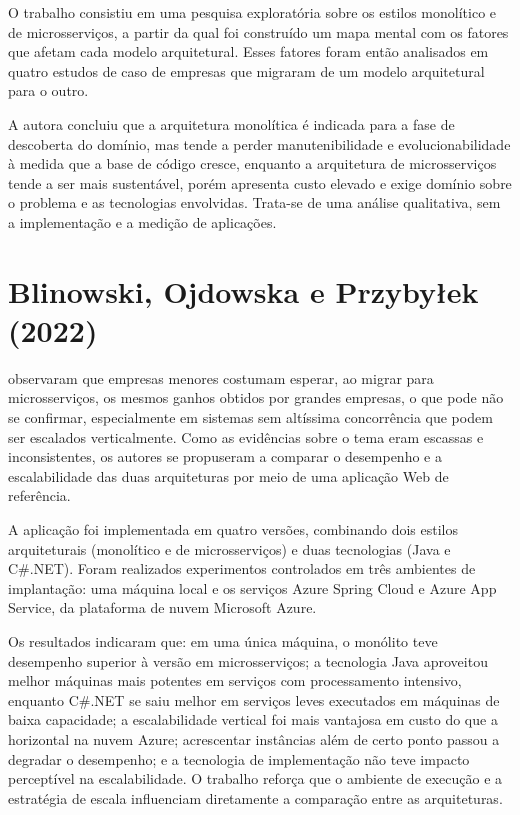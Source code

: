 O trabalho consistiu em uma pesquisa exploratória sobre os estilos monolítico e de
microsserviços, a partir da qual foi construído um mapa mental com os fatores que afetam cada
modelo arquitetural. Esses fatores foram então analisados em quatro estudos de caso de
empresas que migraram de um modelo arquitetural para o outro.

A autora concluiu que a arquitetura monolítica é indicada para a fase de descoberta do domínio,
mas tende a perder manutenibilidade e evolucionabilidade à medida que a base de código cresce,
enquanto a arquitetura de microsserviços tende a ser mais sustentável, porém apresenta custo
elevado e exige domínio sobre o problema e as tecnologias envolvidas. Trata-se de uma análise
qualitativa, sem a implementação e a medição de aplicações.

\section{Blinowski, Ojdowska e Przybyłek (2022)}

 observaram que empresas menores costumam esperar, ao migrar para
microsserviços, os mesmos ganhos obtidos por grandes empresas, o que pode não se confirmar,
especialmente em sistemas sem altíssima concorrência que podem ser escalados verticalmente.
Como as evidências sobre o tema eram escassas e inconsistentes, os autores se propuseram a
comparar o desempenho e a escalabilidade das duas arquiteturas por meio de uma aplicação Web de
referência.

A aplicação foi implementada em quatro versões, combinando dois estilos arquiteturais
(monolítico e de microsserviços) e duas tecnologias (Java e C\#.NET). Foram realizados
experimentos controlados em três ambientes de implantação: uma máquina local e os serviços
Azure Spring Cloud e Azure App Service, da plataforma de nuvem Microsoft Azure.

Os resultados indicaram que: em uma única máquina, o monólito teve desempenho superior à
versão em microsserviços; a tecnologia Java aproveitou melhor máquinas mais potentes em
serviços com processamento intensivo, enquanto C\#.NET se saiu melhor em serviços leves
executados em máquinas de baixa capacidade; a escalabilidade vertical foi mais vantajosa em
custo do que a horizontal na nuvem Azure; acrescentar instâncias além de certo ponto passou a
degradar o desempenho; e a tecnologia de implementação não teve impacto perceptível na
escalabilidade. O trabalho reforça que o ambiente de execução e a estratégia de escala
influenciam diretamente a comparação entre as arquiteturas.

